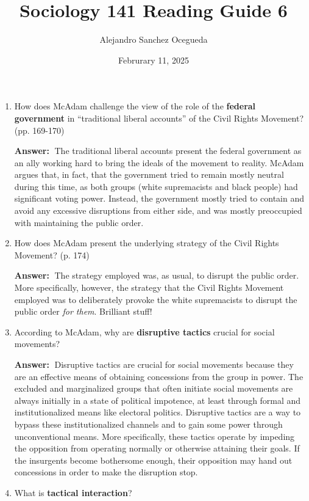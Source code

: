\documentclass{article}
\title{Sociology 141 Reading Guide 6}
\author{Alejandro Sanchez Ocegueda}
\date{Februrary 11, 2025}
\newcommand{\answer}{\textbf{Answer:}$\;$}
\begin{document}
\maketitle

\begin{enumerate}[label=\arabic*)]
    \item How does McAdam challenge the view of the role of the \textbf{federal government} in ``traditional liberal accounts'' of the Civil Rights Movement? (pp. 169-170)
    
    \answer 
    The traditional liberal accounts present the federal government as an ally working hard to bring the ideals of the movement to reality.
    McAdam argues that, in fact, that the government tried to remain mostly neutral during this time, as both groups (white supremacists and black people) had significant voting power.
    Instead, the government mostly tried to contain and avoid any excessive disruptions from either side, and was mostly preoccupied with maintaining the public order.
    
    
    \item How does McAdam present the underlying strategy of the Civil Rights Movement? (p. 174)
    
    \answer 
    The strategy employed was, as usual, to disrupt the public order.
    More specifically, however, the strategy that the Civil Rights Movement employed was to deliberately provoke the white supremacists to disrupt the public order \textit{for them}.
    Brilliant stuff!
    
    
    \item According to McAdam, why are \textbf{disruptive tactics} crucial for social movements?
   
    \answer
    Disruptive tactics are crucial for social movements because they are an effective means of obtaining concessions from the group in power.
    The excluded and marginalized groups that often initiate social movements are always initially in a state of political impotence, at least through formal and institutionalized means like electoral politics.
    Disruptive tactics are a way to bypass these institutionalized channels and to gain some power through unconventional means.
    More specifically, these tactics operate by impeding the opposition from operating normally or otherwise attaining their goals.
    If the insurgents become bothersome enough, their opposition may hand out concessions in order to make the disruption stop.

    
    \item What is \textbf{tactical interaction}?
    

\end{enumerate}
\end{document}
